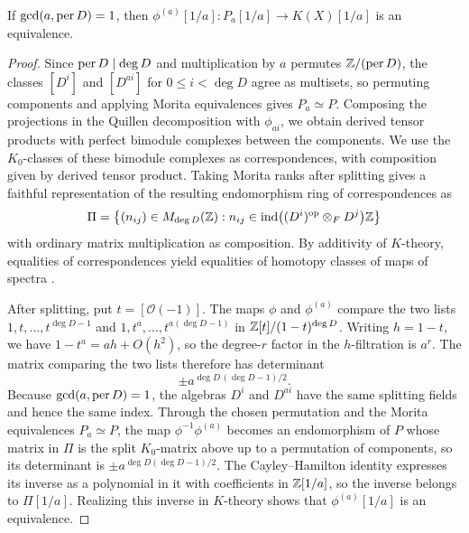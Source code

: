 \begin{lemma}\label{lem:paper-brauer-power-correspondence}
If $\gcd(a,\operatorname{per} D)=1$, then $\phi^{(a)}[1/a]\colon P_a[1/a]\to K(X)[1/a]$ is an equivalence.
\end{lemma}
\begin{proof}
Since $\operatorname{per} D\mid\deg D$ and multiplication by $a$ permutes $\mathbb Z/(\operatorname{per} D)$, the classes $[D^i]$ and $[D^{ai}]$ for $0\le i<\deg D$ agree as multisets, so permuting components and applying Morita equivalences gives $P_a\simeq P$.
Composing the projections in the Quillen decomposition with $\phi_{ai}$, we obtain derived tensor products with perfect bimodule complexes between the components.
We use the $K_0$-classes of these bimodule complexes as correspondences, with composition given by derived tensor product.
Taking Morita ranks after splitting gives a faithful representation of the resulting endomorphism ring of correspondences as
\[
 \Pi=\left\{(n_{ij})\in M_{\deg D}(\mathbb Z):
 n_{ij}\in\operatorname{ind}\bigl((D^i)^{\mathrm{op}}\otimes_F D^j\bigr)\mathbb Z\right\}
\]
with ordinary matrix multiplication as composition.
By additivity of $K$-theory, equalities of correspondences yield equalities of homotopy classes of maps of spectra \cite[Proposition 2.25(i), \S10, (10.1)]{TabuadaVanDenBerghSeparable}.

After splitting, put $t=[\mathcal O(-1)]$.
The maps $\phi$ and $\phi^{(a)}$ compare the two lists $1,t,\ldots,t^{\deg D-1}$ and $1,t^a,\ldots,t^{a(\deg D-1)}$ in $\mathbb Z[t]/(1-t)^{\deg D}$.
Writing $h=1-t$, we have $1-t^a=ah+O(h^2)$, so the degree-$r$ factor in the $h$-filtration is $a^r$.
The matrix comparing the two lists therefore has determinant
\[
                    \pm a^{\deg D\,(\deg D-1)/2}.
\]
Because $\gcd(a,\operatorname{per} D)=1$, the algebras $D^i$ and $D^{ai}$ have the same splitting fields and hence the same index.
Through the chosen permutation and the Morita equivalences $P_a\simeq P$, the map $\phi^{-1}\phi^{(a)}$ becomes an endomorphism of $P$ whose matrix in $\Pi$ is the split $K_0$-matrix above up to a permutation of components, so its determinant is $\pm a^{\deg D(\deg D-1)/2}$.
The Cayley--Hamilton identity expresses its inverse as a polynomial in it with coefficients in $\mathbb Z[1/a]$, so the inverse belongs to $\Pi[1/a]$.
Realizing this inverse in $K$-theory shows that $\phi^{(a)}[1/a]$ is an equivalence.
\end{proof}

